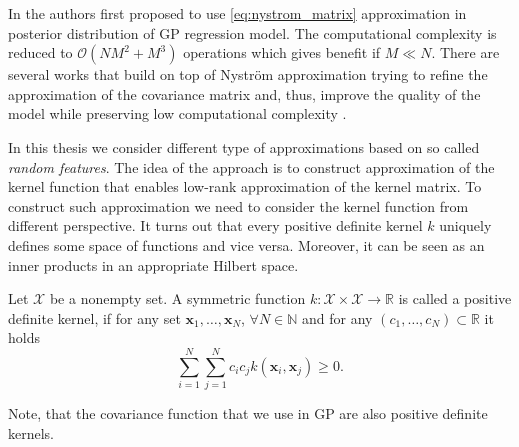 In \citep{williams2001using} the authors first proposed to use
\eqref{eq:nystrom_matrix} approximation in posterior distribution of GP regression model.
The computational complexity is reduced to $\mathcal{O}(NM^2 + M^3)$ operations
which gives benefit if $M \ll N$.
There are several works that build on top of Nystr{\"o}m approximation trying to refine
the approximation of the covariance matrix and, thus, improve the quality of the model
while preserving low computational complexity \citep{quinonero2005unifying, rossi2020sparse}.

In this thesis we consider different type of approximations based on so called
{\em random features}.
The idea of the approach is to construct approximation of the kernel function
that enables low-rank approximation of the kernel matrix.
To construct such approximation we need to consider the kernel function from different
perspective.
It turns out that every positive definite kernel $k$ uniquely defines some space of functions
and vice versa.
Moreover, it can be seen as an inner products in an appropriate Hilbert space.

\begin{definition}
    Let $\mathcal{X}$ be a nonempty set.
    A symmetric function $k \colon \mathcal{X} \times \mathcal{X} \rightarrow \mathbb{R}$
    is called a positive definite kernel, if for any set $\mathbf{x}_1, \ldots, \mathbf{x}_N$,
    $\forall N \in \mathbb{N}$ and for any $(c_1, \ldots, c_N)\subset \mathbb{R}$ it holds
    \[
        \sum_{i=1}^N \sum_{j=1}^N c_i c_j k(\mathbf{x}_i, \mathbf{x}_j) \geq 0.
    \]
\end{definition}

Note, that the covariance function that we use in GP are also positive definite kernels.

